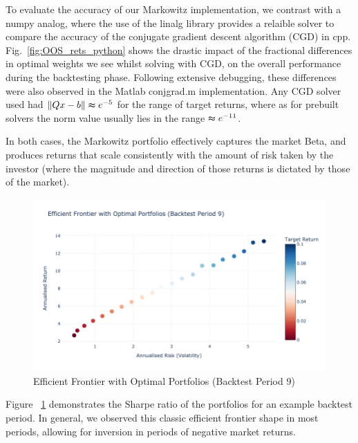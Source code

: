 \documentclass[12pt,twoside]{article}
\begin{document}
To evaluate the accuracy of our Markowitz implementation, we contrast with a numpy analog, where the use of the linalg library provides a relaible solver to compare the accuracy of the conjugate gradient descent algorithm (CGD) in cpp. Fig.~\ref{fig:OOS_rets_python} shows the drastic impact of the fractional differences in optimal weights we see whilst solving with CGD, on the overall performance during the backtesting phase. Following extensive debugging, these differences were also observed in the Matlab conjgrad.m implementation. Any CGD solver used had $\lVert Qx - b \rVert \thickapprox e^{-5}$ for the range of target returns, where as for prebuilt solvers the norm value usually lies in the range $\thickapprox e^{-11}$.
\linebreak

In both cases, the Markowitz portfolio effectively captures the market Beta, and produces returns that scale consistently with the amount of risk taken by the investor (where the magnitude and direction of those returns is dictated by those of the market). 
\linebreak

\begin{figure}[]
\centering %
\includegraphics[width = 1.0\hsize]{./figures/efficint_frontier.png} %
\caption{Efficient Frontier with Optimal Portfolios (Backtest Period 9)} 
\label{fig:efficint_frontier}
\end{figure}

Figure ~\ref{fig:efficint_frontier} demonstrates the Sharpe ratio of the portfolios for an example backtest period. In general, we observed this classic efficient frontier shape in most periods, allowing for inversion in periods of negative market returns. 
\linebreak
\end{document}
